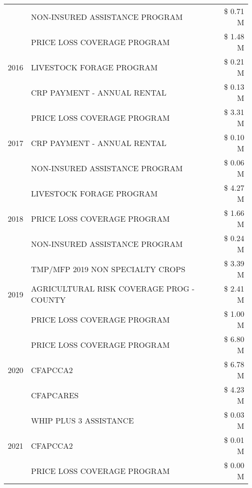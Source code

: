 \begin{tabular}{llr}
 & NON-INSURED ASSISTANCE PROGRAM & \$ 0.71 M \\
\cline{1-3}
\multirow[t]{3}{*}{2016} & PRICE LOSS COVERAGE PROGRAM & \$ 1.48 M \\
 & LIVESTOCK FORAGE PROGRAM & \$ 0.21 M \\
 & CRP PAYMENT - ANNUAL RENTAL & \$ 0.13 M \\
\cline{1-3}
\multirow[t]{3}{*}{2017} & PRICE LOSS COVERAGE PROGRAM & \$ 3.31 M \\
 & CRP PAYMENT - ANNUAL RENTAL & \$ 0.10 M \\
 & NON-INSURED ASSISTANCE PROGRAM & \$ 0.06 M \\
\cline{1-3}
\multirow[t]{3}{*}{2018} & LIVESTOCK FORAGE PROGRAM & \$ 4.27 M \\
 & PRICE LOSS COVERAGE PROGRAM & \$ 1.66 M \\
 & NON-INSURED ASSISTANCE PROGRAM & \$ 0.24 M \\
\cline{1-3}
\multirow[t]{3}{*}{2019} & TMP/MFP 2019 NON SPECIALTY CROPS & \$ 3.39 M \\
 & AGRICULTURAL RISK COVERAGE PROG - COUNTY & \$ 2.41 M \\
 & PRICE LOSS COVERAGE PROGRAM & \$ 1.00 M \\
\cline{1-3}
\multirow[t]{3}{*}{2020} & PRICE LOSS COVERAGE PROGRAM & \$ 6.80 M \\
 & CFAPCCA2 & \$ 6.78 M \\
 & CFAPCARES & \$ 4.23 M \\
\cline{1-3}
\multirow[t]{3}{*}{2021} & WHIP PLUS 3 ASSISTANCE & \$ 0.03 M \\
 & CFAPCCA2 & \$ 0.01 M \\
 & PRICE LOSS COVERAGE PROGRAM & \$ 0.00 M \\
\cline{1-3}
\bottomrule
\end{tabular}

